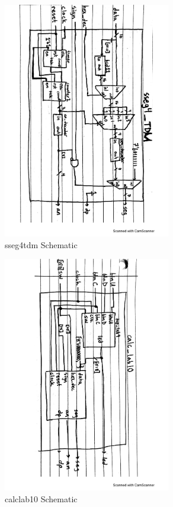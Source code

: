 \documentclass[11pt]{article}
\begin{document}
\begin{figure}[ht]\centering
	\includegraphics[width=0.65\textwidth,angle=90,origin=c]{sseg4tdmdiagram}
	\caption{sseg4tdm Schematic}
	\label{fig:sim_with_table}
\end{figure}

\begin{figure}[ht]\centering
	\includegraphics[width=0.65\textwidth,trim =0 0 0 0,clip,angle=90,origin=c]{calclab10diagram}
	\caption{calclab10 Schematic}
	\label{fig:sim_with_table}
\end{figure}
\end{document}
